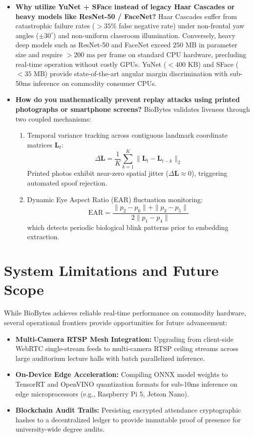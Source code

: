 \documentclass[12pt,a4paper,oneside]{report}
\begin{document}
\begin{itemize}
    \item \textbf{Why utilize YuNet + SFace instead of legacy Haar Cascades or heavy models like ResNet-50 / FaceNet?}
    Haar Cascades suffer from catastrophic failure rates ($> 35\%$ false negative rate) under non-frontal yaw angles ($\pm 30^\circ$) and non-uniform classroom illumination. Conversely, heavy deep models such as ResNet-50 and FaceNet exceed $250\text{ MB}$ in parameter size and require $> 200\text{ ms}$ per frame on standard CPU hardware, precluding real-time operation without costly GPUs. YuNet ($< 400\text{ KB}$) and SFace ($< 35\text{ MB}$) provide state-of-the-art angular margin discrimination with sub-50ms inference on commodity consumer CPUs.

    \item \textbf{How do you mathematically prevent replay attacks using printed photographs or smartphone screens?}
    BioBytes validates liveness through two coupled mechanisms:
    \begin{enumerate}
        \item Temporal variance tracking across contiguous landmark coordinate matrices $\mathbf{L}_t$:
        $$\Delta \mathbf{L} = \frac{1}{K} \sum_{k=1}^K \|\mathbf{L}_{t} - \mathbf{L}_{t-k}\|_2$$
        Printed photos exhibit near-zero spatial jitter ($\Delta \mathbf{L} \approx 0$), triggering automated spoof rejection.
        \item Dynamic Eye Aspect Ratio (EAR) fluctuation monitoring:
        $$\text{EAR} = \frac{\|p_2 - p_6\| + \|p_3 - p_5\|}{2 \|p_1 - p_4\|}$$
        which detects periodic biological blink patterns prior to embedding extraction.
    \end{enumerate}
\end{itemize}

\section{System Limitations and Future Scope}
While BioBytes achieves reliable real-time performance on commodity hardware, several operational frontiers provide opportunities for future advancement:
\begin{itemize}
    \item \textbf{Multi-Camera RTSP Mesh Integration:} Upgrading from client-side WebRTC single-stream feeds to multi-camera RTSP ceiling streams across large auditorium lecture halls with batch parallelized inference.
    \item \textbf{On-Device Edge Acceleration:} Compiling ONNX model weights to TensorRT and OpenVINO quantization formats for sub-10ms inference on edge microprocessors (e.g., Raspberry Pi 5, Jetson Nano).
    \item \textbf{Blockchain Audit Trails:} Persisting encrypted attendance cryptographic hashes to a decentralized ledger to provide immutable proof of presence for university-wide degree audits.
\end{itemize}
\end{document}
